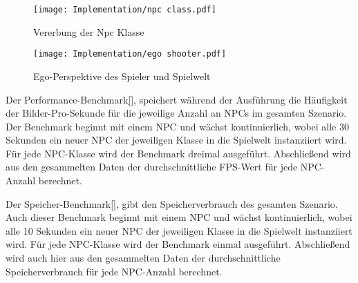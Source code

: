 \begin{figure}[h]
  \centering
  \texttt{[image: Implementation/npc class.pdf]}
	\captionsetup{justification=justified, format=plain}
  \caption{Vererbung der Npc Klasse}
  \label{fig:npc class}
\end{figure}

\begin{figure}[h]
  \centering
  \texttt{[image: Implementation/ego shooter.pdf]}
	\captionsetup{justification=justified, format=plain}
  \caption{Ego-Perspektive des Spieler und Spielwelt}
  \label{fig:ego shooter}
\end{figure}

Der Performance-Benchmark\ref{}, speichert während der Ausführung die Häufigkeit der Bilder-Pro-Sekunde für die jeweilige Anzahl an NPCs im gesamten Szenario. Der Benchmark beginnt mit einem NPC und wächst kontinuierlich, wobei alle 30 Sekunden ein neuer NPC der jeweiligen Klasse in die Spielwelt instanziiert wird. Für jede NPC-Klasse wird der Benchmark dreimal ausgeführt. Abschlie\ss{}end wird aus den gesammelten Daten der durchschnittliche FPS-Wert für jede NPC-Anzahl berechnet.

Der Speicher-Benchmark\ref{}, gibt den Speicherverbrauch des gesamten Szenario. Auch dieser Benchmark beginnt mit einem NPC und wächst kontinuierlich, wobei alle 10 Sekunden ein neuer NPC der jeweiligen Klasse in die Spielwelt instanziiert wird. Für jede NPC-Klasse wird der Benchmark einmal ausgeführt. Abschlie\ss{}end wird auch hier aus den gesammelten Daten der durchschnittliche Speicherverbrauch für jede NPC-Anzahl berechnet.
